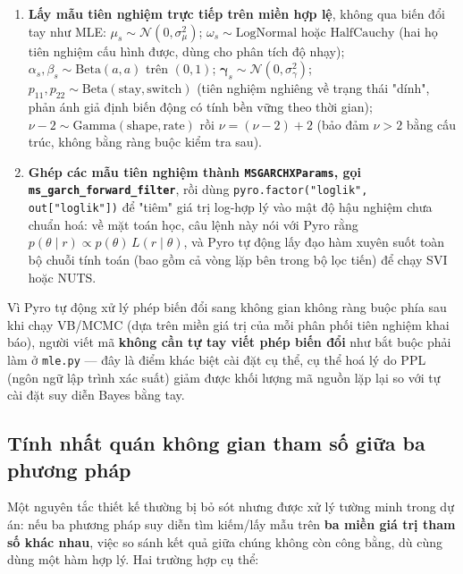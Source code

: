 \documentclass[11pt,a4paper]{article}
\newcommand{\code}[1]{\texttt{#1}}
\begin{document}
\begin{enumerate}
  \item \textbf{Lấy mẫu tiên nghiệm trực tiếp trên miền hợp lệ}, không qua biến đổi
    tay như MLE: $\mu_s\sim\mathcal N(0,\sigma_\mu^2)$; $\omega_s\sim
    \mathrm{LogNormal}$ hoặc $\mathrm{HalfCauchy}$ (hai họ tiên nghiệm cấu hình được,
    dùng cho phân tích độ nhạy); $\alpha_s,\beta_s\sim\mathrm{Beta}(a,a)$ trên
    $(0,1)$; $\boldsymbol\gamma_s\sim\mathcal N(0,\sigma_\gamma^2)$; $p_{11},p_{22}
    \sim\mathrm{Beta}(\text{stay},\text{switch})$ (tiên nghiệm nghiêng về trạng thái
    "dính", phản ánh giả định biến động có tính bền vững theo thời gian); $\nu-2\sim
    \mathrm{Gamma}(\text{shape},\text{rate})$ rồi $\nu=(\nu-2)+2$ (bảo đảm $\nu>2$
    bằng cấu trúc, không bằng ràng buộc kiểm tra sau).
  \item \textbf{Ghép các mẫu tiên nghiệm thành \code{MSGARCHXParams}, gọi
    \code{ms\_garch\_forward\_filter}}, rồi dùng \code{pyro.factor("loglik",
    out["loglik"])} để "tiêm" giá trị log-hợp lý vào mật độ hậu nghiệm chưa chuẩn
    hoá: về mặt toán học, câu lệnh này nói với Pyro rằng $p(\theta\mid r)\propto
    p(\theta)\,L(r\mid\theta)$, và Pyro tự động lấy đạo hàm xuyên suốt toàn bộ chuỗi
    tính toán (bao gồm cả vòng lặp bên trong bộ lọc tiến) để chạy SVI hoặc NUTS.
\end{enumerate}

Vì Pyro tự động xử lý phép biến đổi sang không gian không ràng buộc phía sau khi
chạy VB/MCMC (dựa trên miền giá trị của mỗi phân phối tiên nghiệm khai báo), người
viết mã \textbf{không cần tự tay viết phép biến đổi} như bắt buộc phải làm ở
\code{mle.py} --- đây là điểm khác biệt cài đặt cụ thể, cụ thể hoá lý do PPL (ngôn
ngữ lập trình xác suất) giảm được khối lượng mã nguồn lặp lại so với tự cài đặt suy
diễn Bayes bằng tay.

\subsection{Tính nhất quán không gian tham số giữa ba phương pháp}
\label{sec:consistency}

Một nguyên tắc thiết kế thường bị bỏ sót nhưng được xử lý tường minh trong dự án:
nếu ba phương pháp suy diễn tìm kiếm/lấy mẫu trên \textbf{ba miền giá trị tham số
khác nhau}, việc so sánh kết quả giữa chúng không còn công bằng, dù cùng dùng một
hàm hợp lý. Hai trường hợp cụ thể:
\end{document}
